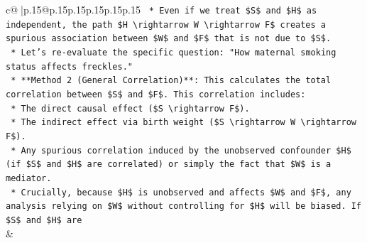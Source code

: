 \documentclass{article}
\begin{document}
{\begin{supertabular}{c@{$\;$}|p{.15\linewidth}@{}p{.15\linewidth}p{.15\linewidth}p{.15\linewidth}p{.15\linewidth}p{.15\linewidth}}
{{{\texttt{    *   Even if we treat \$S\$ and \$H\$ as independent, the path \$H \textbackslash{}rightarrow W \textbackslash{}rightarrow F\$ creates a spurious association between \$W\$ and \$F\$ that is not due to \$S\$.} \\
\texttt{    *   Let's re{-}evaluate the specific question: "How maternal smoking status affects freckles."} \\
\texttt{    *   **Method 2 (General Correlation)**: This calculates the total correlation between \$S\$ and \$F\$. This correlation includes:} \\
\texttt{        *   The direct causal effect (\$S \textbackslash{}rightarrow F\$).} \\
\texttt{        *   The indirect effect via birth weight (\$S \textbackslash{}rightarrow W \textbackslash{}rightarrow F\$).} \\
\texttt{        *   Any spurious correlation induced by the unobserved confounder \$H\$ (if \$S\$ and \$H\$ are correlated) or simply the fact that \$W\$ is a mediator.} \\
\texttt{        *   Crucially, because \$H\$ is unobserved and affects \$W\$ and \$F\$, any analysis relying on \$W\$ without controlling for \$H\$ will be biased. If \$S\$ and \$H\$ are} \\
            }
        }
    }
    & \\ \\


\end{supertabular}}
\end{document}
